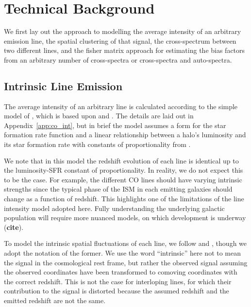 \documentclass{aastex62}
\begin{document}
\section{Technical Background}\label{sec:tech_back}
We first lay out the approach to modelling the average intensity of an
arbitrary emission line, the spatial clustering of that signal, the
cross-spectrum between two different lines, and the fisher matrix approach for
estimating the bias factors from an arbitrary number of cross-spectra or
cross-spectra and auto-spectra.

\subsection{Intrinsic Line Emission}\label{ssec:line_emission}
The average intensity of an arbitrary line is calculated according
to the simple model of \citet{2016ApJ...825..143L}, which is based upon
\citet{2011ApJ...741...70L} and \citet{2013ApJ...768...15P}. The details are laid out in
Appendix~\ref{app:co_int}, but in brief the model assumes a \citet{1976ApJ...203..297S} form for the star formation rate function and a linear relationship
between a halo's luminosity and its star formation rate with constants of
proportionality from \citet{2010JCAP...11..016V}.

We note that in this model the redshift evolution of each line is identical up
to the luminosity-SFR constant of proportionality. In reality, we do not
expect this to be the case. For example, the different CO lines should have
varying intrinsic strengths since the typical phase of the ISM in each
emitting galaxies should change as a function of redshift. This highlights one
of the limitations of the line intensity model adopted here. Fully
understanding the underlying galactic population will require more nuanced
models, on which development is underway ({\bf cite}).

To model the intrinsic spatial fluctuations of each line, we follow
\citet{2016ApJ...825..143L} and \citet{2016ApJ...832..165C}, though we adopt
the notation of the former. We use the word ``intrinsic'' here not to mean the
signal in the cosmological rest frame, but rather the observed signal assuming
the observed coordinates have been transformed to comoving coordinates with
the correct redshift. This is not the case for interloping lines, for which
their contribution to the signal is distorted because the assumed redshift and
the emitted redshift are not the same. 
\end{document}
